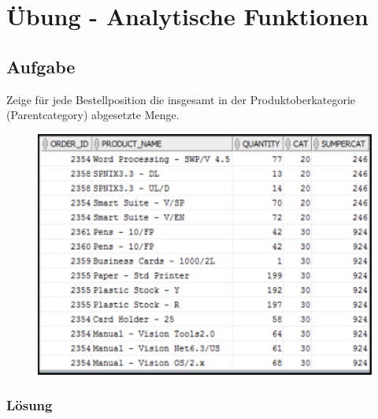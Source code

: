 \section{Übung - Analytische Funktionen}
\label{sec:uebung_07}

\label{subsec:uebung_07.aufgabe_01}
\subsection{Aufgabe}
Zeige für jede Bestellposition die insgesamt in der Produktoberkategorie (Parentcategory) abgesetzte Menge.

\begin{figure}[H]
  \centering
  \includegraphics[width=1\textwidth]{img//uebung_07_-_aufgabe_01.png}
  \label{img:uebung_07_-_aufgabe_01}
\end{figure} 

\subsubsection*{Lösung}
\label{subsubsec:uebung_07.aufgabe_01.loesung}


\label{subsec:uebung_07.aufgabe_02}

